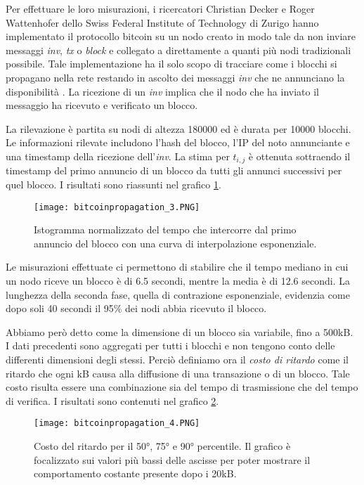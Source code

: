 Per effettuare le loro misurazioni, i ricercatori Christian Decker e
Roger Wattenhofer dello Swiss Federal Institute of Technology di Zurigo
hanno implementato il protocollo bitcoin su un nodo creato in modo tale
da non inviare messaggi \emph{inv}, \emph{tx} o \emph{block} e collegato
a direttamente a quanti più nodi tradizionali possibile. Tale
implementazione ha il solo scopo di tracciare come i blocchi si
propagano nella rete restando in ascolto dei messaggi \emph{inv} che ne
annunciano la disponibilità \cite{bitcoinpropagation}. La ricezione di
un \emph{inv} implica che il nodo che ha inviato il messaggio ha
ricevuto e verificato un blocco.

La rilevazione è partita su nodi di altezza 180000 ed è durata per 10000
blocchi. Le informazioni rilevate includono l'hash del blocco, l'IP del
noto annunciante e una timestamp della ricezione dell'\emph{inv}. La
stima per $t_{i,j}$ è ottenuta sottraendo il timestamp del primo
annuncio di un blocco da tutti gli annunci successivi per quel blocco. I
risultati sono riassunti nel grafico \ref{bitcoinpropagation_3}.

\begin{figure}[htbp]
\centering
\texttt{[image: bitcoinpropagation\_3.PNG]}
\caption{Istogramma normalizzato del tempo che intercorre dal primo
annuncio del blocco con una curva di interpolazione
esponenziale.\label{bitcoinpropagation_3}}
\end{figure}

Le misurazioni effettuate ci permettono di stabilire che il tempo
mediano in cui un nodo riceve un blocco è di 6.5 secondi, mentre la
media è di 12.6 secondi. La lunghezza della seconda fase, quella di
contrazione esponenziale, evidenzia come dopo soli 40 secondi il 95\%
dei nodi abbia ricevuto il blocco.

Abbiamo però detto come la dimensione di un blocco sia variabile, fino a
500kB. I dati precedenti sono aggregati per tutti i blocchi e non
tengono conto delle differenti dimensioni degli stessi. Perciò definiamo
ora il \emph{costo di ritardo} come il ritardo che ogni kB causa alla
diffusione di una transazione o di un blocco. Tale costo risulta essere
una combinazione sia del tempo di trasmissione che del tempo di
verifica. I risultati sono contenuti nel grafico
\ref{bitcoinpropagation_4}.

\begin{figure}[htbp]
\centering
\texttt{[image: bitcoinpropagation\_4.PNG]}
\caption{Costo del ritardo per il 50°, 75° e 90° percentile. Il grafico
è focalizzato sui valori più bassi delle ascisse per poter mostrare il
comportamento costante presente dopo i
20kB.\label{bitcoinpropagation_4}}
\end{figure}


